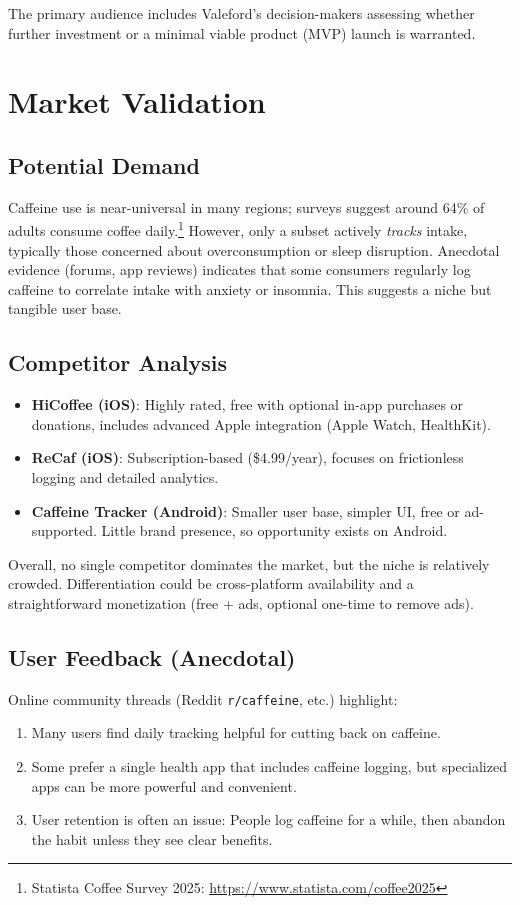 \documentclass[12pt]{article}
\begin{document}
The primary audience includes Valeford’s decision-makers assessing whether 
further investment or a minimal viable product (MVP) launch is warranted.

\section{Market Validation}

\subsection{Potential Demand}
Caffeine use is near-universal in many regions; surveys suggest around 64\% of adults 
consume coffee daily.\footnote{Statista Coffee Survey 2025: \url{https://www.statista.com/coffee2025}}  
However, only a subset actively \textit{tracks} intake, typically those concerned about 
overconsumption or sleep disruption. Anecdotal evidence (forums, app reviews) indicates 
that some consumers regularly log caffeine to correlate intake with anxiety or insomnia. 
This suggests a niche but tangible user base.

\subsection{Competitor Analysis}
\begin{itemize}[leftmargin=2em]
    \item \textbf{HiCoffee (iOS)}: Highly rated, free with optional in-app purchases or donations, 
    includes advanced Apple integration (Apple Watch, HealthKit).  
    \item \textbf{ReCaf (iOS)}: Subscription-based (\$4.99/year), focuses on frictionless logging 
    and detailed analytics.  
    \item \textbf{Caffeine Tracker (Android)}: Smaller user base, simpler UI, free or ad-supported. 
    Little brand presence, so opportunity exists on Android.
\end{itemize}

Overall, no single competitor dominates the market, but the niche is relatively crowded. 
Differentiation could be cross-platform availability and a straightforward monetization 
(free + ads, optional one-time to remove ads).

\subsection{User Feedback (Anecdotal)}
Online community threads (Reddit \texttt{r/caffeine}, etc.) highlight:
\begin{enumerate}[leftmargin=2em]
    \item Many users find daily tracking helpful for cutting back on caffeine.
    \item Some prefer a single health app that includes caffeine logging, but 
    specialized apps can be more powerful and convenient.
    \item User retention is often an issue: People log caffeine for a while, then 
    abandon the habit unless they see clear benefits.
\end{enumerate}
\end{document}
